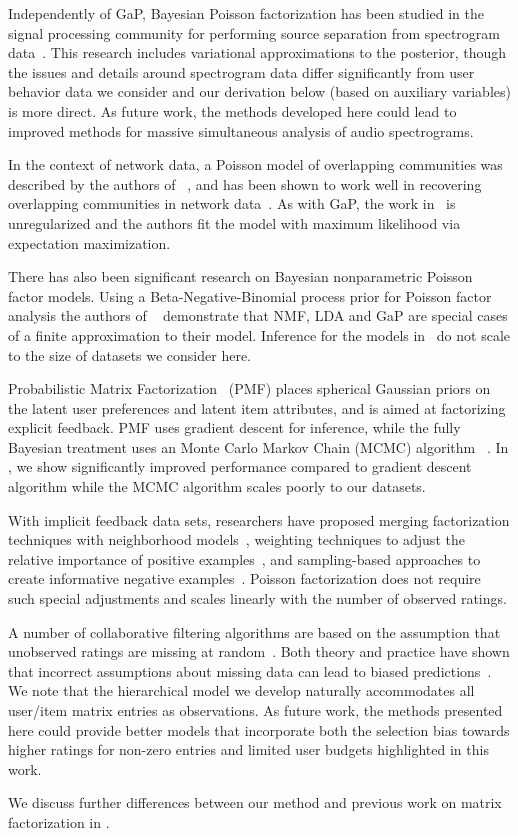 Independently of GaP, Bayesian Poisson factorization has been studied
in the signal processing community for performing source separation
from spectrogram data~\cite{Cemgil:2009,Hoffman:2012}.  This research
includes variational approximations to the posterior, though the
issues and details around spectrogram data differ significantly from
user behavior data we consider and our derivation below (based on
auxiliary variables) is more direct.  As future work, the methods
developed here could lead to improved methods for massive simultaneous
analysis of audio spectrograms.

In the context of network data, a Poisson model of overlapping
communities was described by the authors of ~\cite{Ball:2011}, and has
been shown to work well in recovering overlapping communities in
network data~\cite{Gopalan:2013}.  As with GaP, the work
in~\cite{Ball:2011} is unregularized and the authors fit the model
with maximum likelihood via expectation maximization.

There has also been significant research on Bayesian nonparametric
Poisson factor models. Using a Beta-Negative-Binomial process prior
for Poisson factor analysis the authors of ~\cite{Zhou:2012}
demonstrate that NMF, LDA and GaP are special cases of a finite
approximation to their model. Inference for the models
in~\cite{Zhou:2012} do not scale to the size of datasets we consider
here.

Probabilistic Matrix Factorization~\cite{Salakhutdinov:2008a} (PMF)
places spherical Gaussian priors on the latent user preferences and
latent item attributes, and is aimed at factorizing explicit feedback.
PMF uses gradient descent for inference, while the fully Bayesian
treatment uses an Monte Carlo Markov Chain (MCMC) algorithm
~\cite{Salakhutdinov:2008}.  In , we show significantly
improved performance compared to gradient descent algorithm while the
MCMC algorithm scales poorly to our datasets.

With implicit feedback data sets, researchers have proposed merging
factorization techniques with neighborhood models~\cite{Koren:2008},
weighting techniques to adjust the relative importance of positive
examples~\cite{Hu:2008p9402}, and sampling-based approaches to create
informative negative
examples~\cite{Gantner:2012p9364,Dror:2012a,Paquet:2013p9197}.
Poisson factorization does not require such special adjustments and
scales linearly with the number of observed ratings.


A number of collaborative filtering algorithms are based on the
assumption that unobserved ratings are missing at
random~\cite{Marlin:2012}. Both theory and practice have shown that
incorrect assumptions about missing data can lead to biased
predictions~\cite{Marlin:2009}. We note that the hierarchical model we
develop naturally accommodates all user/item matrix entries as
observations. As future work, the methods presented here could provide
better models that incorporate both the selection bias towards higher
ratings for non-zero entries and limited user budgets highlighted in
this work.

We discuss further differences between our method and previous work on
matrix factorization in .

